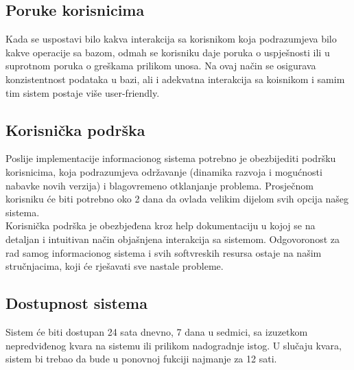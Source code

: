 \documentclass[utf8]{article}
\begin{document}
\subsection{Poruke korisnicima}
Kada se uspostavi bilo kakva interakcija sa korisnikom koja podrazumjeva bilo kakve operacije sa bazom, odmah se korisniku daje poruka o uspješnosti ili u suprotnom poruka o greškama prilikom unosa. Na ovaj način se osigurava konzistentnost podataka u bazi, ali i adekvatna interakcija sa koisnikom i samim tim sistem postaje više user-friendly.
\subsection{Korisnička podrška}
Poslije implementacije informacionog sistema potrebno je obezbijediti podršku korisnicima, koja podrazumjeva održavanje (dinamika razvoja i mogućnosti nabavke novih verzija) i blagovremeno otklanjanje problema. Prosječnom korisniku će biti potrebno oko 2 dana da ovlada velikim dijelom svih opcija našeg sistema.\\
Korisnička podrška je obezbjeđena kroz help dokumentaciju u kojoj se na detaljan i intuitivan način objašnjena interakcija sa sistemom. Odgovoronost za rad samog informacionog sistema i svih softvreskih resursa ostaje na našim stručnjacima, koji će rješavati sve nastale probleme.
\subsection{Dostupnost sistema}
Sistem će biti dostupan 24 sata dnevno, 7 dana u sedmici, sa izuzetkom nepredviđenog kvara na sistemu ili prilikom nadogradnje istog. U slučaju kvara, sistem bi trebao da bude u ponovnoj fukciji najmanje za 12 sati.
\end{document}
